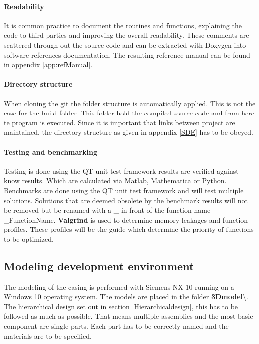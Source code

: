 \documentclass[11pt,fleqn,,a4paper,twoside,openright]{book}
\begin{document}
\paragraph{Readability}
It is common practice to document the routines and functions, explaining the code to third parties and improving the overall readability. These comments are scattered through out the source code and can be extracted with Doxygen into software references documentation. The resulting reference manual can be found in appendix \ref{app:refManual}.

\paragraph{Directory structure}
When cloning the git the folder structure is automatically applied. This is not the case for the build folder. This folder hold the compiled source code and from here te program is executed. Since it is important that links between project are maintained, the directory structure as given in appendix \ref{SDE} has to be obeyed.

\paragraph{Testing and benchmarking}
Testing is done using the QT unit test framework results are verified against know results. Which are calculated via Matlab, Mathematica or Python. Benchmarks are done using the QT unit test framework and will test multiple solutions. Solutions that are deemed obsolete by the benchmark results will not be removed but be renamed with a \_ in front of the function name \_FunctionName. \textbf{Valgrind} is used to determine memory leakages and function profiles. These profiles will be the guide which determine the priority of functions to be optimized.

\subsection{Modeling development environment}
The modeling of the casing is performed with Siemens NX 10 running on a Windows 10 operating system. The models are placed in the folder \textbf{3Dmodel}\textbackslash<Release name>. The hierarchical design set out in section \ref{Hierarchicaldesign}, this has to be followed as much as possible. That means multiple assemblies and the most basic component are single parts. Each part has to be correctly named and the materials are to be specified.
\end{document}
